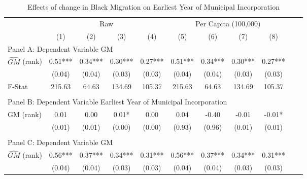  \begin{table}[htbp]\centering {} \begin{threeparttable} \caption{Effects of change in Black Migration on Earliest Year of Municipal Incorporation} \begin{tabular}{l*{10}{c}} \toprule
                &\multicolumn{4}{c}{Raw}                                    &\multicolumn{4}{c}{Per Capita (100,000)}                   \\\cmidrule(lr){2-5}\cmidrule(lr){6-9}
                &\multicolumn{1}{c}{(1)}   &\multicolumn{1}{c}{(2)}   &\multicolumn{1}{c}{(3)}   &\multicolumn{1}{c}{(4)}   &\multicolumn{1}{c}{(5)}   &\multicolumn{1}{c}{(6)}   &\multicolumn{1}{c}{(7)}   &\multicolumn{1}{c}{(8)}   \\
\cmidrule(lr){1-9}
\multicolumn{8}{l}{Panel A: Dependent Variable GM}\\
\cmidrule(lr){1-9}
$\hat{GM}$ (rank)&       0.51***&       0.34***&       0.30***&       0.27***&       0.51***&       0.34***&       0.30***&       0.27***\\
                &     (0.04)   &     (0.04)   &     (0.03)   &     (0.03)   &     (0.04)   &     (0.04)   &     (0.03)   &     (0.03)   \\
\midrule
F-Stat          &     215.63   &      64.63   &     134.69   &     105.37   &     215.63   &      64.63   &     134.69   &     105.37   \\
\cmidrule[\heavyrulewidth](lr){1-9} \\ \cmidrule[\heavyrulewidth](lr){1-9}
\multicolumn{8}{l}{Panel B: Dependent Variable Earliest Year of Municipal Incorporation}\\
\cmidrule(lr){1-9}
GM  (rank)      &       0.01   &       0.00   &       0.01*  &       0.00   &       0.04   &      -0.40   &      -0.01   &      -0.01*  \\
                &     (0.01)   &     (0.01)   &     (0.00)   &     (0.00)   &     (0.93)   &     (0.96)   &     (0.01)   &     (0.01)   \\
\cmidrule[\heavyrulewidth](lr){1-9} \\ \cmidrule[\heavyrulewidth](lr){1-9}
\multicolumn{8}{l}{Panel C: Dependent Variable GM}\\
\cmidrule(lr){1-9}
$\hat{GM}$ (rank)&       0.56***&       0.37***&       0.34***&       0.31***&       0.56***&       0.37***&       0.34***&       0.31***\\
                &     (0.04)   &     (0.04)   &     (0.03)   &     (0.03)   &     (0.04)   &     (0.04)   &     (0.03)   &     (0.03)   \\

\end{tabular}
\end{threeparttable}
\end{table}

